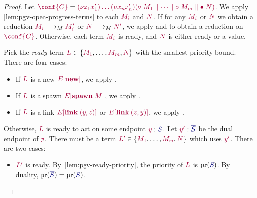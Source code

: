 \begin{proof}

  \label{prf:thm-pgv-closed-progress-confs}
  Let $\tm{\conf{C}}=\tm{\res{x_1}{x'_1}{\dots\res{x_n}{x'_n}{(\child\;M_1\parallel\dots\parallel\child\;M_m\parallel\main\;N)}}}$.
  We apply \cref{lem:pgv-open-progress-terms} to each $\tm{M_i}$ and $\tm{N}$. If for any $\tm{M_i}$ or $\tm{N}$ we obtain a reduction $\tm{M_i}\tred\tm{M'_i}$ or $\tm{N}\tred\tm{N'}$, we apply  and  to obtain a reduction on $\tm{\conf{C}}$.
  Otherwise, each term $\tm{M_i}$ is ready, and $\tm{N}$ is either ready or a value.

  Pick the \emph{ready} term $\tm{L}\in\{\tm{M_1},\dots,\tm{M_m},\tm{N}\}$ with the smallest priority bound. There are four cases: 
  \begin{itemize}
  \item
    If $\tm{L}$ is a new $\tm{\plug{E}{\new}}$, we apply .
  \item
    If $\tm{L}$ is a spawn $\tm{\plug{E}{\spawn\;M}}$, we apply .
  \item
    If $\tm{L}$ is a link $\tm{\plug{E}{\link\;\pair{y}{z}}}$ or $\tm{\plug{E}{\link\;\pair{z}{y}}}$, we apply .
  \end{itemize}
  Otherwise, $\tm{L}$ is ready to act on some endpoint $\tmty{y}{S}$. Let $\tmty{y'}{\co{S}}$ be the dual endpoint of $\tm{y}$. There must be a term $\tm{L'}\in\{\tm{M_1},\dots,\tm{M_m},\tm{N}\}$ which uses $\tm{y'}$.
  There are two cases:
  \begin{itemize}
  \item
    $\tm{L'}$ is ready. By~\cref{lem:pgv-ready-priority}, the priority of $\tm{L}$ is $\pr(\ty{S})$. By duality, $\pr(\ty{\co{S}})=\pr(\ty{S})$.


\end{itemize}
\end{proof}
